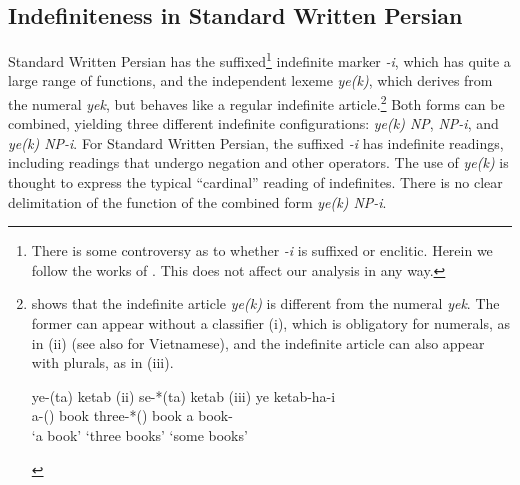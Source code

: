 \documentclass[output=paper]{langsci/langscibook}
\begin{document}
\subsection{Indefiniteness in Standard Written Persian}\label{4sec:32}

Standard Written Persian has the suffixed\footnote{There is some controversy as to whether {\emph{-i}} is suffixed or enclitic. Herein we follow the works of \cite{ghomeshi:03, hincha:61, karimi:03, paul:08}. This does not affect our analysis in any way.} indefinite marker {\emph{-i}}, which has quite a large range of functions, and the independent lexeme {\emph{ye(k)}}, which derives from the numeral {\emph{yek}}, but behaves like a regular indefinite article.\footnote{\cite[][64-65]{ghomeshi:03} shows that the indefinite article {\emph{ye(k)}} is different from the numeral {\emph{yek}}. The former can appear without a classifier (i), which is obligatory for numerals, as in (ii) (see also  for Vietnamese), and the indefinite article can also appear with plurals, as in (iii).
\begin{exe}
\gll	ye-(ta) ketab 		\hspace*{1cm}(ii)   	se-*(ta)        ketab         	\hspace*{1cm}(iii) 	ye ketab-ha-i \\
    	a-({})    book 	{}				three-*({})  book 	{}				a   book-{} \\
\glt  	`a book' 			\hspace*{2.05cm}`three books'           			\hspace*{2cm}`some books'
\end{exe}
} 
Both forms can be combined, yielding three different indefinite configurations: {\emph{ye(k) NP}}, {\emph{NP-i}}, and {\emph{ye(k) NP-i}}. For Standard Written Persian, the suffixed {\emph{-i}} has indefinite readings, including readings that undergo negation and other operators. The use of {\emph{ye(k)}} is thought to express the typical ``cardinal'' reading of indefinites. There is no clear delimitation of the function of the combined form {\emph{ye(k) NP-i}}.
\end{document}
